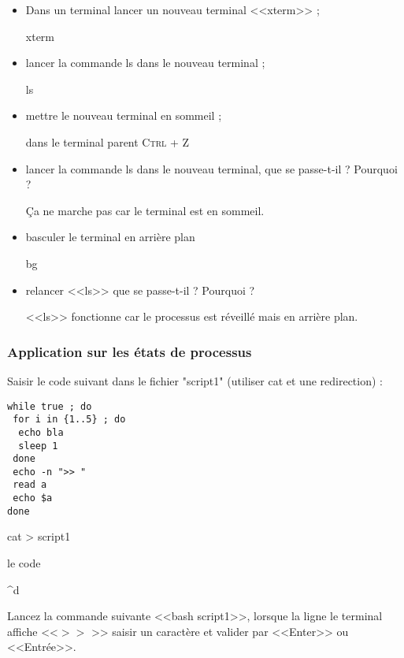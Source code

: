 \documentclass[11pt]{article}
\begin{document}
\begin{itemize}
 \item Dans un terminal lancer un nouveau terminal <<xterm>> ;
\begin{solution}
xterm
\end{solution}
 \item lancer la commande ls dans le nouveau terminal ;
\begin{solution}
ls
\end{solution}
 \item mettre le nouveau terminal en sommeil ;
\begin{solution}
dans le terminal parent \textsc{Ctrl + Z}
\end{solution}
 \item lancer la commande ls dans le nouveau terminal, que se passe-t-il ? Pourquoi ?
\begin{solution}
Ça ne marche pas car le terminal est en sommeil.
\end{solution}
 \item basculer le terminal en arrière plan
\begin{solution}
bg
\end{solution}
 \item relancer <<ls>> que se passe-t-il ? Pourquoi ?
\begin{solution}
<<ls>> fonctionne car le processus est réveillé mais en arrière plan.
\end{solution}
\end{itemize}

\subsubsection{Application sur les états de processus}

Saisir le code suivant dans le fichier "script1" (utiliser cat et une redirection) :

\begin{lstlisting}
while true ; do
 for i in {1..5} ; do
  echo bla
  sleep 1
 done
 echo -n ">> "
 read a
 echo $a
done
\end{lstlisting}

\begin{solution}

cat > script1

le code

\^{}d

\end{solution}

Lancez la commande suivante <<bash script1>>, lorsque la ligne le terminal affiche <<$>> $ >> saisir un caractère et valider par <<Enter>> ou <<Entrée>>.
\end{document}
